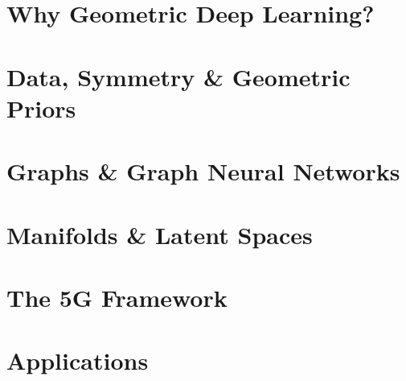 %

\section[Hook]{Why Geometric Deep Learning?}


\section[Data \& Symmetry]{Data, Symmetry \& Geometric Priors}


\section[GNNs]{Graphs \& Graph Neural Networks}


\section[Manifolds]{Manifolds \& Latent Spaces}


\section[Framework]{The 5G Framework}


\section[Apps]{Applications}


